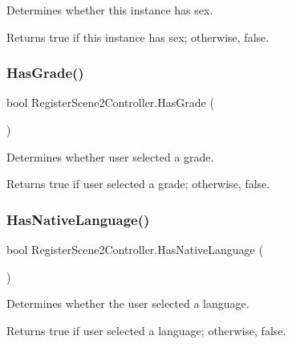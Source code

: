 Determines whether this instance has sex. 

\begin{DoxyReturn}{Returns}
{\ttfamily true} if this instance has sex; otherwise, {\ttfamily false}.
\end{DoxyReturn}
\mbox{\label{classRegisterScene2Controller_a051efecaea664a6a5766db397932e0e8}} 
\subsubsection{\texorpdfstring{Has\+Grade()}{HasGrade()}}
{\footnotesize\ttfamily bool Register\+Scene2\+Controller.\+Has\+Grade (\begin{DoxyParamCaption}{ }\end{DoxyParamCaption})\hspace{0.3cm}{\ttfamily [inline]}}



Determines whether user selected a grade. 

\begin{DoxyReturn}{Returns}
{\ttfamily true} if user selected a grade; otherwise, {\ttfamily false}.
\end{DoxyReturn}
\mbox{\label{classRegisterScene2Controller_a5ce68b1c110e3e97f1a9b871ab84628f}} 
\subsubsection{\texorpdfstring{Has\+Native\+Language()}{HasNativeLanguage()}}
{\footnotesize\ttfamily bool Register\+Scene2\+Controller.\+Has\+Native\+Language (\begin{DoxyParamCaption}{ }\end{DoxyParamCaption})\hspace{0.3cm}{\ttfamily [inline]}}



Determines whether the user selected a language. 

\begin{DoxyReturn}{Returns}
{\ttfamily true} if user selected a language; otherwise, {\ttfamily false}.
\end{DoxyReturn}
\mbox{\label{classRegisterScene2Controller_a19e707aac8d6d7e9d6af8f53f086be24}} 
